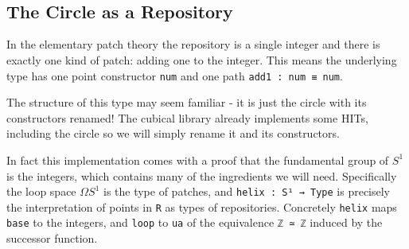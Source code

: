 \begin{code}[hide]
\>[2]\AgdaSymbol{;}\AgdaSpace{}%
\<%
\\
%
\>[2]\AgdaSymbol{;}\AgdaSpace{}%
\<%
\\
%
\>[2]\AgdaSymbol{;}\AgdaSpace{}%
\<%
\\
%
\>[2]\AgdaSymbol{;}\AgdaSpace{}%
\<%
\\
%
\>[2]\AgdaSymbol{)}\<%
\\
%
\\[\AgdaEmptyExtraSkip]%
\>[0]\AgdaSpace{}%
\AgdaSpace{}%
\<%
\\
\>[0][@{}l@{\AgdaIndent{0}}]%
\>[2]\AgdaSpace{}%
\AgdaSymbol{(}\AgdaSymbol{)}\<%
\end{code}

\subsection{The Circle as a Repository}

In the elementary patch theory the repository is a single integer and there is exactly one kind of patch:
adding one to the integer. This means the underlying type has one point constructor \texttt{num} and
one path \texttt{add1 : num ≡ num}.

The structure of this type may seem familiar - it is just the circle with its constructors renamed!
The cubical library already implements some HITs, including the circle so we will simply rename it and
its constructors.

In fact this implementation comes with a proof that the fundamental group of $S^1$ is the integers,
which contains many of the ingredients we will need. Specifically the loop space $ΩS^1$ is the type
of patches, and \texttt{helix : S¹ → Type} is precisely the interpretation of points in \texttt{R} as
types of repositories. Concretely \texttt{helix} maps \texttt{base} to the integers, and \texttt{loop}
to \texttt{ua} of the equivalence \texttt{ℤ ≃ ℤ} induced by the successor function.

